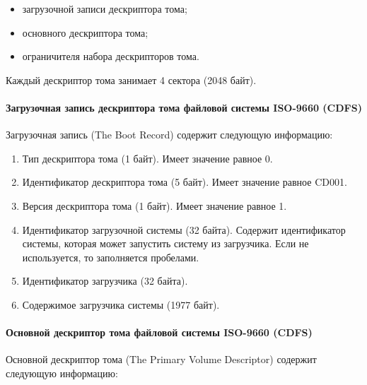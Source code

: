 \begin{itemize}
\item загрузочной записи дескриптора тома;
\item основного дескриптора тома;
\item ограничителя набора дескрипторов тома.
\end{itemize}

Каждый дескриптор тома занимает 4 сектора (2048 байт).

\paragraph{Загрузочная запись дескриптора тома файловой системы ISO-9660 (CDFS)}

Загрузочная запись (The Boot Record) содержит следующую информацию:

\begin{enumerate}
\item Тип дескриптора тома (1 байт). Имеет значение равное 0.
\item Идентификатор дескриптора тома (5 байт). Имеет значение равное \textquotedbl CD001\textquotedbl.
\item Версия дескриптора тома (1 байт). Имеет значение равное 1.
\item Идентификатор загрузочной системы (32 байта). Содержит идентификатор системы, которая может запустить систему из загрузчика. Если не используется, то заполняется пробелами.
\item Идентификатор загрузчика (32 байта).
\item Содержимое загрузчика системы (1977 байт). 
\end{enumerate}

\paragraph{Основной дескриптор тома файловой системы ISO-9660 (CDFS)}

Основной дескриптор тома (The Primary Volume Descriptor) содержит следующую информацию:

